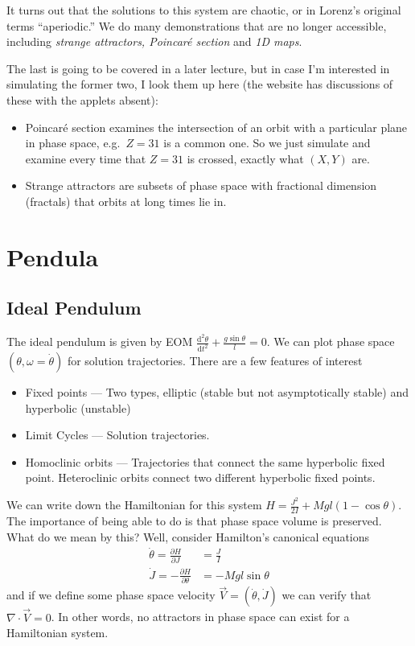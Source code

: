 \documentclass[12pt]{article}
\newcommand{\pd}[2]{\frac{\partial#1}{\partial#2}}
\newcommand{\rtd}[2]{\frac{\mathrm{d}^2#1}{\mathrm{d}#2^2}}
\begin{document}
It turns out that the solutions to this system are chaotic, or in Lorenz's
original terms ``aperiodic.'' We do many demonstrations that are no longer
accessible, including \emph{strange attractors, Poincar\'e section} and
\emph{1D maps}.

The last is going to be covered in a later lecture, but in case I'm interested
in simulating the former two, I look them up here (the website has discussions
of these with the applets absent):
\begin{itemize}
    \item Poincar\'e section examines the intersection of an orbit with a
        particular plane in phase space, e.g.\ $Z=31$ is a common one. So we
        just simulate and examine every time that $Z=31$ is crossed, exactly
        what $(X,Y)$ are.
    \item Strange attractors are subsets of phase space with fractional
        dimension (fractals) that orbits at long times lie in.
\end{itemize}

\clearpage

\section{Pendula}

\subsection{Ideal Pendulum}

The ideal pendulum is given by EOM $\rtd{\theta}{t} + \frac{g\sin\theta}{l} =
0$. We can plot phase space $(\theta, \omega = \dot{\theta})$ for solution
trajectories. There are a few features of interest
\begin{itemize}
    \item Fixed points --- Two types, elliptic (stable but not asymptotically
        stable) and hyperbolic (unstable)
    \item Limit Cycles --- Solution trajectories.
    \item Homoclinic orbits --- Trajectories that connect the same hyperbolic
        fixed point. Heteroclinic orbits connect two different hyperbolic fixed
        points.
\end{itemize}

We can write down the Hamiltonian for this system $H = \frac{J^2}{2I} +
Mgl(1-\cos\theta)$. The importance of being able to do is that phase space
volume is preserved. What do we mean by this? Well, consider Hamilton's
canonical equations
\begin{align}
    \dot{\theta} = \pd{H}{J} &= \frac{J}{I} \nonumber\\
    \dot{J} = -\pd{H}{\theta} &= -Mgl\sin\theta
\end{align}
and if we define some phase space velocity $\vec{V} = \left( \dot{\theta},
\dot{J} \right)$ we can verify that $\nabla \cdot \vec{V} = 0$. In other words,
no attractors in phase space can exist for a Hamiltonian system.
\end{document}
